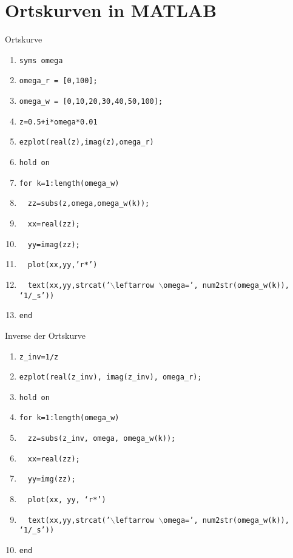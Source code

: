 \section{Ortskurven in MATLAB}
Ortskurve
\begin{enumerate}[$\texttt{>}\texttt{>}$]
\item {\color{red}\texttt{syms omega}}
\item {\color{red}\texttt{omega\_r = [0,100];}}
\item {\color{red}\texttt{omega\_w = [0,10,20,30,40,50,100];}}
\item {\color{red}\texttt{z=0.5+i*omega*0.01}}
\item {\color{red}\texttt{ezplot(real(z),imag(z),omega\_r)}}
\item {\color{red}\texttt{hold on}}
\item {\color{red}\texttt{for k=1:length(omega\_w)}}
\item $\quad${\color{red}\texttt{zz=subs(z,omega,omega\_w(k));}}
\item $\quad${\color{red}\texttt{xx=real(zz);}}
\item $\quad${\color{red}\texttt{yy=imag(zz);}}
\item $\quad${\color{red}\texttt{plot(xx,yy,'r*')}}
\item $\quad${\color{red}\texttt{text(xx,yy,strcat('$\backslash$leftarrow $\backslash$omega=', num2str(omega\_w(k)), `1/\_s'))}}
\item {\color{red}\texttt{end}}
\end{enumerate}
Inverse der Ortskurve
\begin{enumerate}[$\texttt{>}\texttt{>}$]
\item {\color{red}\texttt{z\_inv=1/z}}
\item {\color{red}\texttt{ezplot(real(z\_inv), imag(z\_inv), omega\_r);}}
\item {\color{red}\texttt{hold on}}
\item {\color{red}\texttt{for k=1:length(omega\_w)}}
\item $\quad${\color{red}\texttt{zz=subs(z\_inv, omega, omega\_w(k));}}
\item $\quad${\color{red}\texttt{xx=real(zz);}}
\item $\quad${\color{red}\texttt{yy=img(zz);}}
\item $\quad${\color{red}\texttt{plot(xx, yy, `r*')}}
\item $\quad${\color{red}\texttt{text(xx,yy,strcat('$\backslash$leftarrow $\backslash$omega=', num2str(omega\_w(k)), `1/\_s'))}}
\item {\color{red}\texttt{end}}
\end{enumerate}






